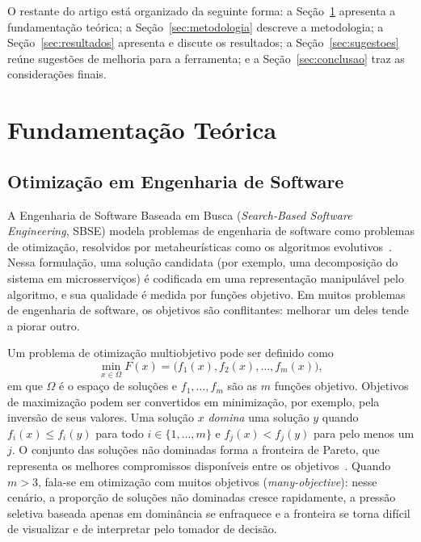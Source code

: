 \documentclass[conference]{IEEEtran}
\begin{document}
O restante do artigo está organizado da seguinte forma: a Seção~\ref{sec:fundamentacao} apresenta a fundamentação teórica; a Seção~\ref{sec:metodologia} descreve a metodologia; a Seção~\ref{sec:resultados} apresenta e discute os resultados; a Seção~\ref{sec:sugestoes} reúne sugestões de melhoria para a ferramenta; e a Seção~\ref{sec:conclusao} traz as considerações finais.

\section{Fundamentação Teórica}\label{sec:fundamentacao}

\subsection{Otimização em Engenharia de Software}\label{sec:sbse}

A Engenharia de Software Baseada em Busca (\textit{Search-Based Software Engineering}, SBSE) modela problemas de engenharia de software como problemas de otimização, resolvidos por metaheurísticas como os algoritmos evolutivos~\cite{li2022}. Nessa formulação, uma solução candidata (por exemplo, uma decomposição do sistema em microsserviços) é codificada em uma representação manipulável pelo algoritmo, e sua qualidade é medida por funções objetivo. Em muitos problemas de engenharia de software, os objetivos são conflitantes: melhorar um deles tende a piorar outro.

Um problema de otimização multiobjetivo pode ser definido como
\begin{equation}
\min_{x \in \Omega} F(x) = \big(f_1(x), f_2(x), \ldots, f_m(x)\big),
\label{eq:mop}
\end{equation}
em que $\Omega$ é o espaço de soluções e $f_1, \ldots, f_m$ são as $m$ funções objetivo. Objetivos de maximização podem ser convertidos em minimização, por exemplo, pela inversão de seus valores. Uma solução $x$ \textit{domina} uma solução $y$ quando $f_i(x) \le f_i(y)$ para todo $i \in \{1, \ldots, m\}$ e $f_j(x) < f_j(y)$ para pelo menos um $j$. O conjunto das soluções não dominadas forma a fronteira de Pareto, que representa os melhores compromissos disponíveis entre os objetivos~\cite{li2022}. Quando $m > 3$, fala-se em otimização com muitos objetivos (\textit{many-objective}): nesse cenário, a proporção de soluções não dominadas cresce rapidamente, a pressão seletiva baseada apenas em dominância se enfraquece e a fronteira se torna difícil de visualizar e de interpretar pelo tomador de decisão.
\end{document}
